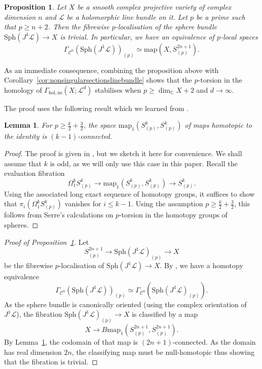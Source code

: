 \documentclass[a4paper]{amsart}
\newcommand{\bC}{\mathbb C}
\newcommand{\cC}{\mathcal C}
\newcommand{\cL}{\mathcal L}
\newcommand{\lra}{\longrightarrow}
\newcommand\map{\mathrm{map}}
\newcommand{\Sph}{\mathrm{Sph}}
\theoremstyle{plain}
\newtheorem{proposition}[theorem]{Proposition}
\newtheorem{lemma}[theorem]{Lemma}
\theoremstyle{definition}
\begin{document}
\begin{proposition}\label{prop:stableptorsion}
Let $X$ be a smooth complex projective variety of complex dimension $n$ and $\cL$ be a holomorphic line bundle on it. Let $p$ be a prime such that $p \geq n + 2$. Then the fibrewise $p$-localisation of the sphere bundle $\Sph(J^1\cL) \to X$ is trivial. In particular, we have an equivalence of $p$-local spaces
\[
    \Gamma_{\cC^0}\left( \Sph(J^1\cL) \right)_{(p)} \simeq \map(X, S^{2n+1}_{(p)}).
\]
\end{proposition}
As an immediate consequence, combining the proposition above with Corollary~\ref{cor:nonsingularsectionslinebundle} shows that the $p$-torsion in the homology of $\Gamma_{\mathrm{hol,ns}}(X; \cL^d)$ stabilises when $p \geq \dim_\bC X + 2$ and $d \to \infty$.

\bigskip

The proof uses the following result which we learned from \cite[Proposition~4.1]{bendersky_localization_2014}.
\begin{lemma}\label{lemma:ptorsionconnectedness}
For $p \geq \frac{k}{2} + \frac{3}{2}$, the space $\map_1(S^k_{(p)}, S^k_{(p)})$ of maps homotopic to the identity is $(k-1)$-connected.
\end{lemma}

\begin{proof}
The proof is given in \cite{bendersky_localization_2014}, but we sketch it here for convenience. We shall assume that $k$ is odd, as we will only use this case in this paper. Recall the evaluation fibration
\[
    \Omega^k_1 S^k_{(p)} \lra \map_1(S^k_{(p)}, S^k_{(p)}) \lra S^k_{(p)}.
\]
Using the associated long exact sequence of homotopy groups, it suffices to show that $\pi_i(\Omega^k_1 S^k_{(p)})$ vanishes for $i \leq k-1$. Using the assumption $p \geq \frac{k}{2} + \frac{3}{2}$, this follows from Serre's calculations on $p$-torsion in the homotopy groups of spheres.
\end{proof}

\begin{proof}[Proof of Proposition~\ref{prop:stableptorsion}]
Let 
\[
    S^{2n+1}_{(p)} \lra \Sph(J^1\cL)_{(p)} \lra X
\]
be the fibrewise $p$-localisation of $\Sph(J^1\cL) \to X$. By \cite[Theorem 5.3]{moller_nilpotent_1987}, we have a homotopy equivalence
\[
    \Gamma_{\cC^0}\left( \Sph(J^1\cL) \right)_{(p)} \simeq \Gamma_{\cC^0}\left( \Sph(J^1\cL)_{(p)} \right).
\]
As the sphere bundle is canonically oriented (using the complex orientation of $J^1\cL$), the fibration $\Sph(J^1\cL)_{(p)} \to X$ is classified by a map
\[
    X \lra B\map_1(S^{2n+1}_{(p)}, S^{2n+1}_{(p)}).
\]
By Lemma~\ref{lemma:ptorsionconnectedness}, the codomain of that map is $(2n+1)$-connected. As the domain has real dimension $2n$, the classifying map must be null-homotopic thus showing that the fibration is trivial.
\end{proof}

 

\end{document}

